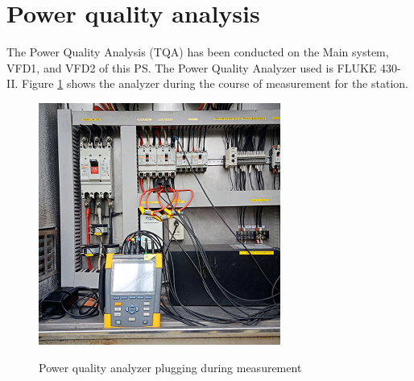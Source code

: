%
\section{Power quality analysis} \label{ch04_elecaudit_powerquality}
The Power Quality Analysis (TQA) has been conducted on the Main system, VFD1, and VFD2 of this PS. The Power Quality Analyzer used is FLUKE 430-II. Figure \ref{fig_ch04_elecaudit_powerqualityanalyzer} shows the analyzer during the course of measurement for the station.

\begin{figure}[!htb]
	\includegraphics[scale=0.5]{figures/fig_ch04_elecaudit_powerqualityanalyzer} \\
	\caption{Power quality analyzer plugging during measurement}
	\label{fig_ch04_elecaudit_powerqualityanalyzer} 
\end{figure}


